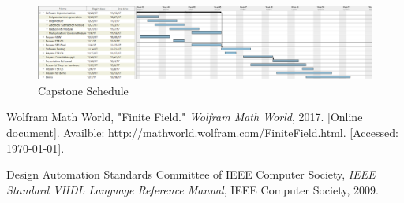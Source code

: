 \documentclass[12pt]{extarticle}
\begin{document}
    \begin{figure}[h]
        \begin{center}
            \includegraphics[width=1\textwidth]{gantt_chart.png}
            \caption{Capstone Schedule} \label{fig:gantt_chart}
        \end{center}
    \end{figure}

    \begin{thebibliography}{2}
        Wolfram Math World, "Finite Field." \textit{Wolfram Math World},
        2017. [Online document]. Availble:
              http://mathworld.wolfram.com/FiniteField.html. [Accessed:
              \today].

        Design Automation Standards Committee of IEEE Computer Society,
        \textit{IEEE Standard VHDL Language Reference Manual}, IEEE Computer
        Society, 2009.
    \end{thebibliography}
\end{document}
